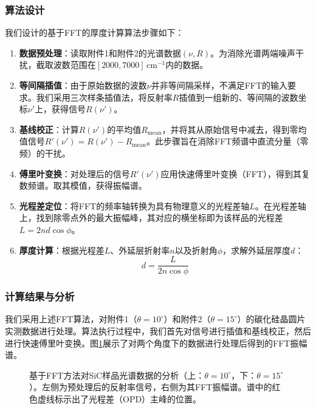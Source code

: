 \documentclass{ctexart} %
\begin{document}
\subsubsection{算法设计}
我们设计的基于FFT的厚度计算算法步骤如下：
\begin{enumerate}
    \item \textbf{数据预处理}：读取附件1和附件2的光谱数据$(\nu, R)$。为消除光谱两端噪声干扰，截取波数范围在$[2000, 7000]\, \text{cm}^{-1}$内的数据。
    \item \textbf{等间隔插值}：由于原始数据的波数$\nu$并非等间隔采样，不满足FFT的输入要求。我们采用三次样条插值法，将反射率$R$插值到一组新的、等间隔的波数坐标$\nu'$上，获得信号$R(\nu')$。
    \item \textbf{基线校正}：计算$R(\nu')$的平均值$R_{\text{mean}}$，并将其从原始信号中减去，得到零均值信号$R'(\nu') = R(\nu') - R_{\text{mean}}$。此步骤旨在消除FFT频谱中直流分量（零频）的干扰。
    \item \textbf{傅里叶变换}：对处理后的信号$R'(\nu')$应用快速傅里叶变换（FFT），得到其复数频谱。取其模值，获得振幅谱。
    \item \textbf{光程差定位}：将FFT的频率轴转换为具有物理意义的光程差轴$L$。在光程差轴上，找到除零点外的最大振幅峰，其对应的横坐标即为该样品的光程差$L = 2nd\cos\phi$。
    \item \textbf{厚度计算}：根据光程差$L$、外延层折射率$n$以及折射角$\phi$，求解外延层厚度$d$：
          $$ d = \frac{L}{2n\cos\phi} $$
\end{enumerate}

\subsubsection{计算结果与分析}

我们采用上述FFT算法，对附件1（$\theta=10^\circ$）和附件2（$\theta=15^\circ$）的碳化硅晶圆片实测数据进行处理。算法执行过程中，我们首先对信号进行插值和基线校正，然后进行快速傅里叶变换。图\ref{fig:fft_results}展示了对两个角度下的数据进行处理后得到的FFT振幅谱。

\begin{figure}[htbp]
    \centering
    
    \caption{基于FFT方法对SiC样品光谱数据的分析（上：$\theta=10^\circ$，下：$\theta=15^\circ$）。左侧为预处理后的反射率信号，右侧为其FFT振幅谱。谱中的红色虚线标示出了光程差（OPD）主峰的位置。}
    \label{fig:fft_results}
\end{figure}
\end{document}
